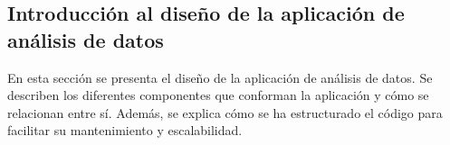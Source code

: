 \subsection{Introducción al diseño de la aplicación de análisis de datos}
\label{sec:diseno-introduccion}

En esta sección se presenta el diseño de la aplicación de análisis de datos. Se describen los diferentes componentes 
que conforman la aplicación y cómo se relacionan entre sí. Además, se explica cómo se ha estructurado el código 
para facilitar su mantenimiento y escalabilidad.
